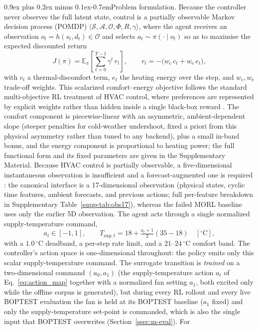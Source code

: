 \documentclass[a4paper,fleqn]{cas-sc}
\makeatletter
\renewcommand\paragraph{\@startsection{paragraph}{4}{\z@}%
 {0.9ex plus 0.2ex minus 0.1ex}{-0.7em}{\normalfont\normalsize\bfseries}}
\newcommand{\suppref}[1]{\ref{supp-#1}}
\makeatother
\begin{document}
\paragraph{Problem formulation.}
Because the controller never observes the full latent state, control is a partially
observable Markov decision process (POMDP)
$\langle \mathcal{S},\mathcal{A},\mathcal{O},\Phi,R,\gamma\rangle$, where the agent
receives an observation $o_t=h(s_t,d_t)\in\mathcal{O}$ and selects $a_t\sim\pi(\cdot\mid o_t)$
so as to maximise the expected discounted return~\citep{Sutton2018RL}
\begin{equation}
J(\pi)=\mathbb{E}_{\pi}\!\left[\sum_{t=0}^{T-1}\gamma^{t}\,r_t\right],
\qquad
r_t = -\big(w_{\mathrm{c}}\,c_t + w_{\mathrm{e}}\,e_t\big),
\label{eq:m-return}
\end{equation}
with $c_t$ a thermal-discomfort term, $e_t$ the heating energy over the step, and
$w_{\mathrm{c}},w_{\mathrm{e}}$ trade-off weights. This scalarized comfort--energy objective follows the standard multi-objective RL treatment of HVAC control, where preferences are represented by explicit weights rather than hidden inside a single black-box reward \citep{Roijers2013MOSurvey,Yang2019MORL,Hayes2022MOSurvey}. The comfort component is piecewise-linear with an asymmetric, ambient-dependent slope (steeper penalties for cold-weather undershoot, fixed a priori from this physical asymmetry rather than tuned to any backend), plus a small in-band bonus, and the energy component is proportional to heating power; the full functional form and its fixed parameters are given in the Supplementary Material. Because HVAC control is partially observable, a five-dimensional instantaneous observation is insufficient and a forecast-augmented one is required \citep{Gao2024Predictive}: the canonical interface is a 17-dimensional observation (physical states, cyclic time features, ambient forecasts, and previous actions; full per-feature breakdown in Supplementary Table~\suppref{tab:obs17}), whereas the failed MORL baseline uses only the earlier 5D observation. The agent acts through a single normalized supply-temperature command,
\begin{equation}
 a_t \in [-1,1],
 \qquad
 T_{\mathrm{sup},t} = 18 + \tfrac{a_t+1}{2}(35-18)\quad [^\circ\mathrm{C}],
 \label{eq:action_map}
\end{equation}
with a $1.0\,^\circ$C deadband, a per-step rate limit, and a $21$--$24\,^\circ$C comfort band. The controller's action space is one-dimensional throughout: the policy emits only this scalar supply-temperature command. The surrogate transition is \emph{trained} on a two-dimensional command $(a_0,a_1)$ (the supply-temperature action $a_t$ of Eq.~\eqref{eq:action_map} together with a normalized fan setting $a_1$, both excited only while the offline corpus is generated), but during every RL rollout and every live BOPTEST evaluation the fan is held at its BOPTEST baseline ($a_1$ fixed) and only the supply-temperature set-point is commanded, which is also the single input that BOPTEST overwrites (Section~\ref{ssec:m-eval}). For
\end{document}
